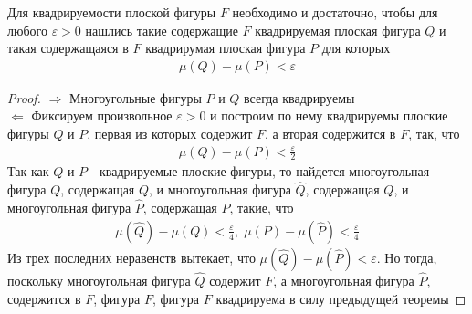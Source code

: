 \documentclass[10pt]{article}
\begin{document}
    \begin{theorem}
        Для квадрируемости плоской фигуры $F$ необходимо и достаточно, чтобы для любого $\varepsilon > 0$ нашлись такие содержащие $F$ квадрируемая плоская фигура $Q$ и такая содержащаяся в $F$ квадрирумая плоская фигура $P$ для которых
        \begin{gather*}
            \mu(Q) - \mu(P) < \varepsilon
        \end{gather*}
    \end{theorem}
    \begin{proof}
        $\Rightarrow$
        Многоугольные фигуры $P$ и $Q$ всегда квадрируемы\\
        $\Leftarrow$
        Фиксируем произвольное $\varepsilon > 0$ и построим по нему квадрируемы плоские фигуры $Q$ и $P$, первая из которых содержит $F$, а вторая содержится в $F$, так, что
        \begin{gather*}
            \mu(Q) - \mu(P) < \frac{\varepsilon}{2}
        \end{gather*}
        Так как $Q$ и $P$ - квадрируемые плоские фигуры, то найдется многоугольная фигура $Q$, содержащая $Q$, и многоугольная фигура $\hat{Q}$, содержащая $Q$, и многоугольная фигура $\hat{P}$, содержащая $P$, такие, что
        \begin{gather*}
            \mu(\hat{Q}) - \mu(Q) < \frac{\varepsilon}{4},\; \mu(P) - \mu(\hat{P}) < \frac{\varepsilon}{4}
        \end{gather*}
        Из трех последних неравенств вытекает, что $\mu(\hat{Q}) - \mu(\hat{P}) < \varepsilon$. Но тогда, поскольку многоугольная фигура $\hat{Q}$ содержит $F$, а многоугольная фигура $\hat{P}$, содержится в $F$, фигура $F$, фигура $F$ квадрируема в силу предыдущей теоремы 
    \end{proof}
\end{document}
